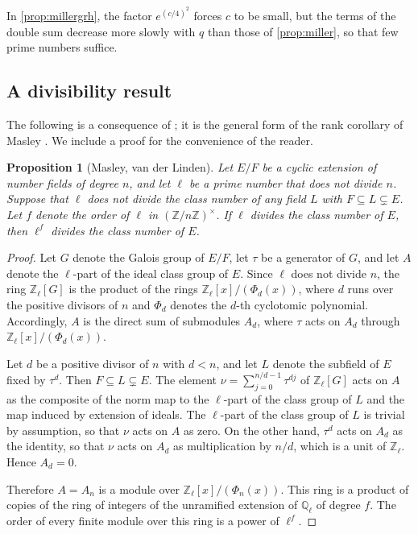 \documentclass[11pt]{amsart}
\theoremstyle{plain}
\newtheorem{proposition}[theorem]{Proposition}
\theoremstyle{definition}
\begin{document}
In \cref{prop:millergrh}, the factor $e^{(c/4)^2}$ forces $c$ to be small, but the terms of the double sum decrease more slowly with $q$ than those of \cref{prop:miller}, so that few prime numbers suffice.

\subsection{A divisibility result}

The following is a consequence of \cite[Theorems 6 and 8]{vdL82}; it is the general form of the rank corollary of Masley \cite[Corollary 2.15]{Ma78}.
We include a proof for the convenience of the reader.

\begin{proposition}[Masley, van der Linden] \label{prop:masley}
Let $E/F$ be a cyclic extension of number fields of degree $n$, and let $\ell$ be a prime number that does not divide $n$.
Suppose that $\ell$ does not divide the class number of any field $L$ with $F \subseteq L \subsetneq E$.
Let $f$ denote the order of $\ell$ in $(\mathbb{Z}/n\mathbb{Z})^\times$.
If $\ell$ divides the class number of $E$, then $\ell^f$ divides the class number of $E$.
\end{proposition}

\begin{proof}
Let $G$ denote the Galois group of $E/F$, let $\tau$ be a generator of $G$, and let $A$ denote the $\ell$-part of the ideal class group of $E$.
Since $\ell$ does not divide $n$, the ring $\mathbb{Z}_\ell[G]$ is the product of the rings $\mathbb{Z}_\ell[x]/(\Phi_d(x))$, where $d$ runs over the positive divisors of $n$ and $\Phi_d$ denotes the $d$-th cyclotomic polynomial.
Accordingly, $A$ is the direct sum of submodules $A_d$, where $\tau$ acts on $A_d$ through $\mathbb{Z}_\ell[x]/(\Phi_d(x))$.

Let $d$ be a positive divisor of $n$ with $d < n$, and let $L$ denote the subfield of $E$ fixed by $\tau^d$.
Then $F \subseteq L \subsetneq E$.
The element $\nu = \sum_{j=0}^{n/d-1} \tau^{dj}$ of $\mathbb{Z}_\ell[G]$ acts on $A$ as the composite of the norm map to the $\ell$-part of the class group of $L$ and the map induced by extension of ideals.
The $\ell$-part of the class group of $L$ is trivial by assumption, so that $\nu$ acts on $A$ as zero.
On the other hand, $\tau^d$ acts on $A_d$ as the identity, so that $\nu$ acts on $A_d$ as multiplication by $n/d$, which is a unit of $\mathbb{Z}_\ell$.
Hence $A_d = 0$.

Therefore $A = A_n$ is a module over $\mathbb{Z}_\ell[x]/(\Phi_n(x))$.
This ring is a product of copies of the ring of integers of the unramified extension of $\mathbb{Q}_\ell$ of degree $f$.
The order of every finite module over this ring is a power of $\ell^f$.
\end{proof}
\end{document}
